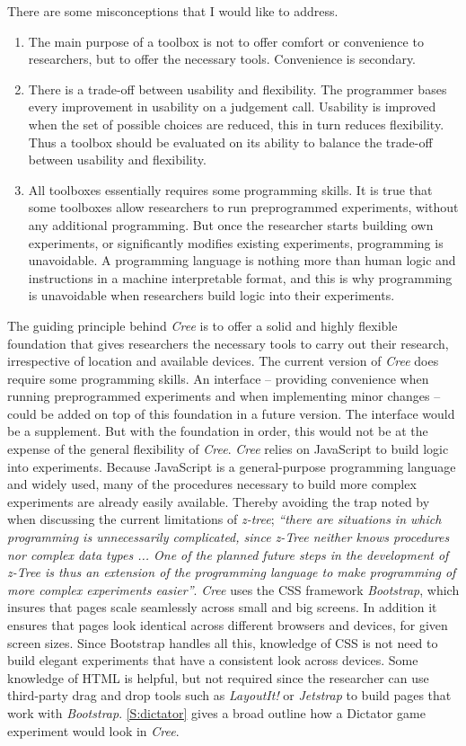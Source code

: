\documentclass[preprint, 12pt]{elsarticle}
\newcommand{\Cree}{\emph{Cree}\xspace}
\begin{document}
There are some misconceptions that I would like to address. 
\begin{enumerate}
\item The main purpose of a toolbox is not to offer comfort or convenience to researchers, but to offer the necessary tools. Convenience is secondary.
\item There is a trade-off between usability and flexibility. The programmer bases every improvement in usability on a judgement call. Usability is improved when the set of possible choices are reduced, this in turn reduces flexibility. Thus a toolbox should be evaluated on its ability to balance the trade-off between usability and flexibility. 
\item All toolboxes essentially requires some programming skills. It is true that some toolboxes allow researchers to run preprogrammed experiments, without any additional programming. But once the researcher starts building own experiments, or significantly modifies existing experiments, programming is unavoidable. A programming language is nothing more than human logic and instructions in a machine interpretable format, and this is why programming is unavoidable when researchers build logic into their experiments.
\end{enumerate}

The guiding principle behind \Cree is to offer a solid and highly flexible foundation that gives researchers the necessary tools to carry out their research, irrespective of location and available devices. The current version of \Cree does require some programming skills. An interface -- providing convenience when running preprogrammed experiments and when implementing minor changes -- could be added on top of this foundation in a future version. The interface would be a supplement. But with the foundation in order, this would not be at the expense of the general flexibility of \Cree. \Cree relies on JavaScript to build logic into experiments. Because JavaScript is a general-purpose programming language and widely used, many of the procedures necessary to build more complex experiments are already easily available. Thereby avoiding the trap noted by \citet[p. 177]{Fischbacher_2007} when discussing the current limitations of \emph{z-tree}; \emph{``there are situations in which programming is unnecessarily complicated, since z-Tree neither knows procedures nor complex data types ... One of the planned future steps in the development of z-Tree is thus an extension of the programming language to make programming of more complex experiments easier''}. \Cree uses the CSS framework \emph{Bootstrap}, which insures that pages scale seamlessly across small and big screens. In addition it ensures that pages look identical across different browsers and devices, for given screen sizes. Since Bootstrap handles all this, knowledge of CSS is not need to build elegant experiments that have a consistent look across devices. Some knowledge of HTML is  helpful, but not required since the researcher can use third-party drag and drop tools such as \emph{LayoutIt!} or \emph{Jetstrap} to build pages that work with \emph{Bootstrap}\footnotemark[8]. \ref{S:dictator} gives a broad outline how a Dictator game experiment would look in \Cree.
\end{document}
